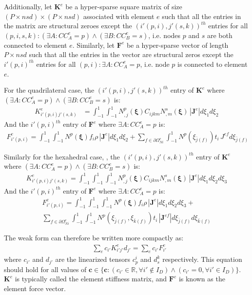 	Additionally, let $\bm{K}^e$ be a hyper-sparse square matrix of size $(P \times nsd) \times (P \times nsd)$ associated with element $e$ such that all the entries in the matrix are structural zeroes except the $(i'(p, i), j'(s, k))^{th}$ entries for all $(p, i, s, k) : (\exists A: CC^e_A = p) \wedge (\exists B: CC^e_B = s)$, i.e. nodes $p$ and $s$ are both connected to element $e$. Similarly, let $\bm{F}^e$ be a hyper-sparse vector of length $P \times nsd$ such that all the entries in the vector are structural zeros except the $i'(p, i)^{th}$ entries for all $(p, i) : \exists A : CC^e_A = p$, i.e. node $p$ is connected to element $e$.

	For the quadrilateral case, the $(i'(p, i), j'(s, k))^{th}$ entry of $\bm{K}^e$ where $(\exists A: CC^e_A = p) \wedge (\exists B: CC^e_B = s)$ is:
	\begin{align}
		K^e_{i'(p, i) j'(s, k)} & = \int_{-1}^1 \int_{-1}^1 N^p_{,j}(\bm{\xi})C_{ijkm}N^s_{,m}(\bm{\xi}) \,|\bm{J}^e|d\xi_1 d\xi_2
	\end{align}
	And the $i'(p, i)^{th}$ entry of $\bm{F}^e$ where $\exists A: CC^e_A = p$ is:
	\begin{multline}
        F^e_{i'(p, i)} = \int_{-1}^1 \int_{-1}^1 N^p(\bm{\xi})f_i \rho\,|\bm{J}^e|d\xi_1 d\xi_2 + \sum_{f \in \partial \Omega^e_{Ni}}\int_{-1}^1 N^p(\xi_{\bar{j}(f)})t_i \,J^{ef} d\xi_{\bar{j}(f)}  
	\end{multline}

	Similarly for the hexahedral case, , the $(i'(p, i), j'(s, k))^{th}$ entry of $\bm{K}^e$ where $(\exists A: CC^e_A = p) \wedge (\exists B: CC^e_B = s)$ is:
	\begin{align}
		K^e_{i'(p, i) j'(s, k)} = \int_{-1}^1 \int_{-1}^1 \int_{-1}^1 N^p_{,j}(\bm{\xi})C_{ijkm}N^s_{,m}(\bm{\xi}) \,|\bm{J}^e|d\xi_1 d\xi_2 d\xi_3
	\end{align}
	And the $i'(p, i)^{th}$ entry of $\bm{F}^e$ where $\exists A: CC^e_A = p$ is:
	\begin{multline}
        F^e_{i'(p, i)} = \int_{-1}^1 \int_{-1}^1 \int_{-1}^1 N^p(\bm{\xi})f_i \rho\,|\bm{J}^e|d\xi_1 d\xi_2 d\xi_3 + \\ \sum_{f \in \partial \Omega^e_{Ni}}\int_{-1}^1 \int_{-1}^1 N^p(\xi_{\bar{j}(f)}, \xi_{\bar{k}(f)})t_i \,|\bm{J}^{ef}| d\xi_{\bar{j}(f)} d\xi_{\bar{k}(f)}
	\end{multline}

	The weak form can therefore be written more compactly as:
	\begin{align}
		& \sum_e c_{i'} K^e_{i'j'} d_{j'} = \sum_e c_{i'} F^e_{i'}
	\end{align}
	where $c_{i'}$ and $d_{j'}$ are the linearized tensors $c_p^i$ and $d_s^k$ respectively. This equation should hold for all values of $\bm{c} \in \{\bm{c} : (c_{i'} \in \mathbb{R}, \forall i' \notin I_D) \wedge (c_{i'} = 0, \forall i' \in I_D)\}$. $\bm{K}^e$ is typically called the element stiffness matrix, and $\bm{F}^e$ is known as the element force vector. 

